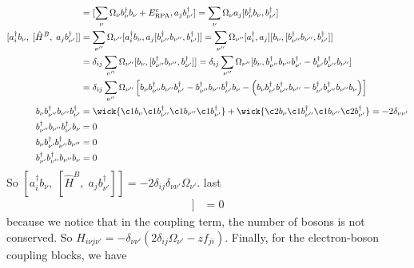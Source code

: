 \begin{align}
[\hat H^B,\;a_j b_{\nu'}^\dagger] &= [\sum_{\nu} \Omega_\nu {b}_\nu^{\dagger} {b}_\nu + E_{\mathrm{RPA}}^c, a_j b_{\nu'}^\dag] = \sum_{\nu} \Omega_\nu a_j[ {b}_\nu^{\dagger} {b}_\nu, b_{\nu'}^\dag] \\
[a_i^\dagger b_\nu,\;[\hat H^B,\;a_j b_{\nu'}^\dagger]] &= \sum_{\nu''} \Omega_{\nu''} [a_i^\dagger b_\nu, a_j [ {b}_{\nu''}^{\dagger} {b}_{\nu''}, b_{\nu'}^\dag]] = \sum_{\nu''} \Omega_{\nu''} [a_i^\dagger, a_j] [b_\nu, [ {b}_{\nu''}^{\dagger} {b}_{\nu''}, b_{\nu'}^\dag]] \\
&= \delta_{ij} \sum_{\nu''} \Omega_{\nu''} [b_\nu, [ {b}_{\nu''}^{\dagger} {b}_{\nu''}, b_{\nu'}^\dag]] = \delta_{ij} \sum_{\nu''} \Omega_{\nu''} [b_\nu,  {b}_{\nu''}^{\dagger} {b}_{\nu''} b_{\nu'}^\dag - b_{\nu'}^\dag {b}_{\nu''}^{\dagger} {b}_{\nu''}] \\
&= \delta_{ij} \sum_{\nu''} \Omega_{\nu''} \left[b_\nu {b}_{\nu''}^{\dagger} {b}_{\nu''} b_{\nu'}^\dag - {b}_{\nu''}^{\dagger} {b}_{\nu''} b_{\nu'}^\dag b_\nu - \left( b_{\nu} {b}_{\nu'}^{\dagger} {b}_{\nu''}^\dag b_{\nu''} - {b}_{\nu'}^{\dagger} {b}_{\nu''}^\dag b_{\nu''} b_{\nu} \right)\right] \\
b_\nu {b}_{\nu''}^{\dagger} {b}_{\nu''} b_{\nu'}^\dag &= \wick{\c1 b_\nu \c1 b_{\nu''}^{\dagger} \c1 b_{\nu''} \c1 b_{\nu'}^\dag} + \wick{\c2 b_\nu \c1 b_{\nu''}^{\dagger} \c1 b_{\nu''} \c2 b_{\nu'}^\dag} = -2\delta_{\nu \nu'} \\
{b}_{\nu''}^{\dagger} {b}_{\nu''} b_{\nu'}^\dag b_\nu & = 0 \\
b_{\nu} {b}_{\nu'}^{\dagger} {b}_{\nu''}^\dag b_{\nu''} &= 0 \\
{b}_{\nu'}^{\dagger} {b}_{\nu''}^\dag b_{\nu''} b_{\nu} &= 0 \\
\end{align}
So $[a_i^\dagger b_\nu,\;[\hat H^B,\;a_j b_{\nu'}^\dagger]] = -2 \delta_{ij} \delta_{\nu \nu'} \Omega_{\nu'}$.
last
\begin{align}
[a_i^\dagger b_\nu,\;[\hat V^{eB},\;a_j b_{\nu'}^\dagger]] & = 0
\end{align}
because we notice that in the coupling term, the number of bosons is not conserved.
So $H_{i\nu j \nu'} = -  \delta_{\nu \nu'} \left(2\delta_{ij}\Omega_{\nu'}-z f_{ji}\right)$. Finally, for the electron-boson coupling blocks, we have
